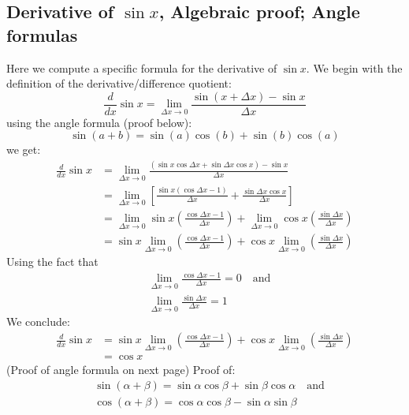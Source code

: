 \documentclass{report}
\begin{document}
\newpage
\subsection{Derivative of $\sin x$, Algebraic proof; Angle formulas} %
Here we compute a specific formula for the derivative of $\sin x$. We begin with the
definition of the derivative/difference quotient:
\begin{equation*}
\frac{d}{dx}\sin x=\lim_{\Delta x\to 0}\frac{\sin(x+\Delta x)-\sin x}{\Delta x}
\end{equation*}
using the angle formula (proof below):
\begin{equation*}
\sin(a+b)=\sin(a)\cos(b)+\sin(b)\cos(a)
\end{equation*}
we get:
\begin{align*}
\frac{d}{dx}\sin x&=\lim_{\Delta x\to 0}\frac{(\sin x\cos\Delta x+\sin\Delta x\cos x)-\sin x}
{\Delta x}\\
&=\lim_{\Delta x\to 0}\left[\frac{\sin x(\cos\Delta x-1)}{\Delta x}+
\frac{\sin\Delta x\cos x}{\Delta x}\right]\\
&=\lim_{\Delta x\to 0}\sin x\left(\frac{\cos\Delta x-1}{\Delta x}\right)+
\lim_{\Delta x\to 0}\cos x\left(\frac{\sin\Delta x}{\Delta x}\right)\\
&=\sin x\lim_{\Delta x\to 0}\left(\frac{\cos\Delta x-1}{\Delta x}\right)
+\cos x\lim_{\Delta x\to 0}\left(\frac{\sin\Delta x}{\Delta x}\right)
\end{align*}
Using the fact that
\begin{align*}
&\lim_{\Delta x\to 0}\frac{\cos\Delta x-1}{\Delta x}=0\quad\text{and}\\
&\lim_{\Delta x\to 0}\frac{\sin\Delta x}{\Delta x}=1
\end{align*}
We conclude:
\begin{align*}
\frac{d}{dx}\sin x&=\sin x\lim_{\Delta x\to 0}\left(\frac{\cos\Delta x-1}{\Delta x}\right)
+\cos x\lim_{\Delta x\to 0}\left(\frac{\sin\Delta x}{\Delta x}\right)\\
&=\cos x
\end{align*}
(Proof of angle formula on next page)
\newpage
Proof of:
\begin{align*}
&\sin(\alpha+\beta)=\sin\alpha\cos\beta+\sin\beta\cos\alpha\quad\text{and}\\
&\cos(\alpha+\beta)=\cos\alpha\cos\beta-\sin\alpha\sin\beta
\end{align*}
\end{document}

